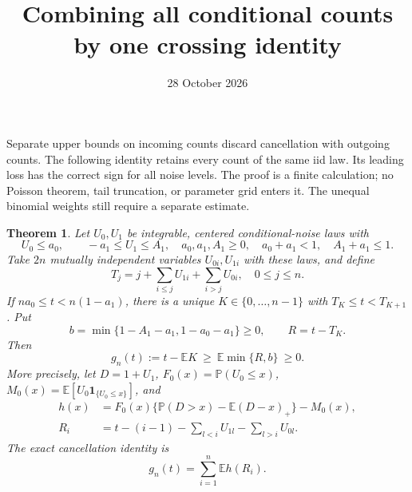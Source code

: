 \documentclass[11pt]{article}
\title{Combining all conditional counts by one crossing identity}
\author{}\date{28 October 2026}
\newtheorem{theorem}{Theorem}\newcommand{\E}{\mathbb E}\newcommand{\Pp}{\mathbb P}
\begin{document}
\maketitle

Separate upper bounds on incoming counts discard cancellation with outgoing
counts. The following identity retains every count of the same iid law.
Its leading loss has the correct sign for all noise levels. The proof is a
finite calculation; no Poisson theorem, tail truncation, or parameter grid
enters it. The unequal binomial weights still require a separate estimate.

\begin{theorem}\label{thm:mesh}
Let $U_0,U_1$ be integrable, centered conditional-noise laws with
\[
 U_0\le a_0,\qquad -a_1\le U_1\le A_1,
 \quad a_0,a_1,A_1\ge0,\quad a_0+a_1<1,\quad A_1+a_1\le1.
\]
Take $2n$ mutually independent variables $U_{0i},U_{1i}$ with these laws,
and define
\[
 T_j=j+\sum_{i\le j}U_{1i}+\sum_{i>j}U_{0i},\quad 0\le j\le n.
\]
If $na_0\le t<n(1-a_1)$, there is a unique $K\in\{0,\ldots,n-1\}$
with $T_K\le t<T_{K+1}$. Put
\[
 b=\min\{1-A_1-a_1,1-a_0-a_1\}\ge0,\qquad R=t-T_K.
\]
Then
\begin{equation}\label{eq:gain}
              g_n(t):=t-\E K\ \ge\ \E\min\{R,b\}\ \ge0.
\end{equation}
More precisely, let $D=1+U_1$, $F_0(x)=\Pp(U_0\le x)$,
$M_0(x)=\E[U_0\mathbf1_{\{U_0\le x\}}]$, and
\begin{align*}
 h(x)&=F_0(x)\{\Pp(D>x)-\E(D-x)_+\}-M_0(x),\\
 R_i&=t-(i-1)-\sum_{l<i}U_{1l}-\sum_{l>i}U_{0l}.
\end{align*}
The exact cancellation identity is
\begin{equation}\label{eq:identity}
                       g_n(t)=\sum_{i=1}^n\E h(R_i).
\end{equation}
\end{theorem}
\end{document}

